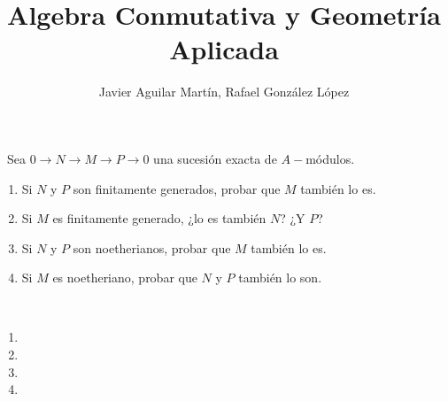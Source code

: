 \documentclass[twoside]{article}
\begin{document}
\title{Algebra Conmutativa y Geometría Aplicada}
\author{Javier Aguilar Martín, Rafael González López}
\maketitle

\begin{ejercicio}{3}\
Sea $0 \to N \to M \to P \to 0$ una sucesión exacta de $A-$módulos.
\begin{enumerate}
\item Si $N$ y $P$ son finitamente generados, probar que $M$ también lo es.
\item Si $M$ es finitamente generado, ¿lo es también $N$? ¿Y $P$?
\item Si $N$ y $P$ son noetherianos, probar que $M$ también lo es.
\item Si $M$ es noetheriano, probar que $N$ y $P$ también lo son.
\end{enumerate}
\end{ejercicio}
\begin{solucion}\
\begin{enumerate}
\item
\item
\item
\item
\end{enumerate}
\end{solucion}

\newpage
\end{document}
